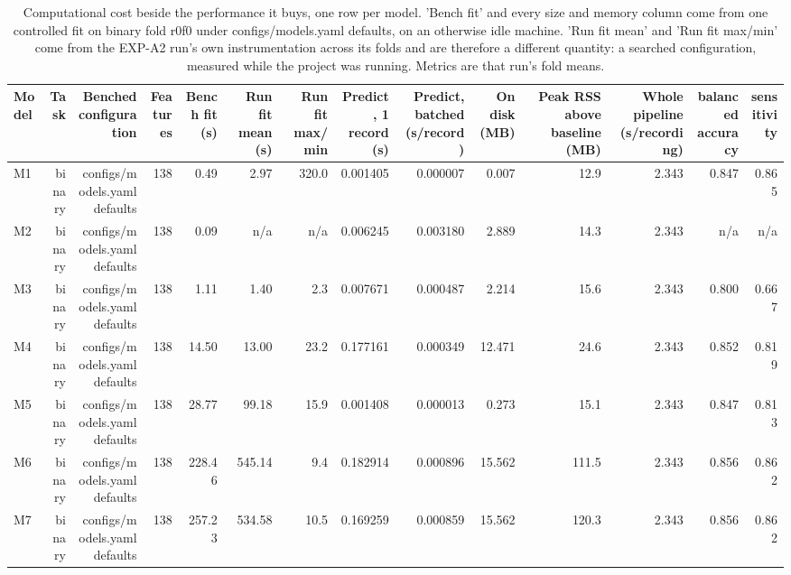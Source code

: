 \begin{table}[htbp]
  \centering
  \caption{Computational cost beside the performance it buys, one row per model. 'Bench fit' and every size and memory column come from one controlled fit on binary fold r0f0 under configs/models.yaml defaults, on an otherwise idle machine. 'Run fit mean' and 'Run fit max/min' come from the EXP-A2 run's own instrumentation across its folds and are therefore a different quantity: a searched configuration, measured while the project was running. Metrics are that run's fold means.}
  \label{tab:t24}
  \begin{tabular}{lrrrrrrrrrrrrr}
    \toprule
    Model & Task & Benched configuration & Features & Bench fit (s) & Run fit mean (s) & Run fit max/min & Predict, 1 record (s) & Predict, batched (s/record) & On disk (MB) & Peak RSS above baseline (MB) & Whole pipeline (s/recording) & balanced accuracy & sensitivity \\
    \midrule
    M1 & binary & configs/models.yaml defaults & 138 & 0.49 & 2.97 & 320.0 & 0.001405 & 0.000007 & 0.007 & 12.9 & 2.343 & 0.847 & 0.865 \\
    M2 & binary & configs/models.yaml defaults & 138 & 0.09 & n/a & n/a & 0.006245 & 0.003180 & 2.889 & 14.3 & 2.343 & n/a & n/a \\
    M3 & binary & configs/models.yaml defaults & 138 & 1.11 & 1.40 & 2.3 & 0.007671 & 0.000487 & 2.214 & 15.6 & 2.343 & 0.800 & 0.667 \\
    M4 & binary & configs/models.yaml defaults & 138 & 14.50 & 13.00 & 23.2 & 0.177161 & 0.000349 & 12.471 & 24.6 & 2.343 & 0.852 & 0.819 \\
    M5 & binary & configs/models.yaml defaults & 138 & 28.77 & 99.18 & 15.9 & 0.001408 & 0.000013 & 0.273 & 15.1 & 2.343 & 0.847 & 0.813 \\
    M6 & binary & configs/models.yaml defaults & 138 & 228.46 & 545.14 & 9.4 & 0.182914 & 0.000896 & 15.562 & 111.5 & 2.343 & 0.856 & 0.862 \\
    M7 & binary & configs/models.yaml defaults & 138 & 257.23 & 534.58 & 10.5 & 0.169259 & 0.000859 & 15.562 & 120.3 & 2.343 & 0.856 & 0.862 \\

\end{tabular}
\end{table}
